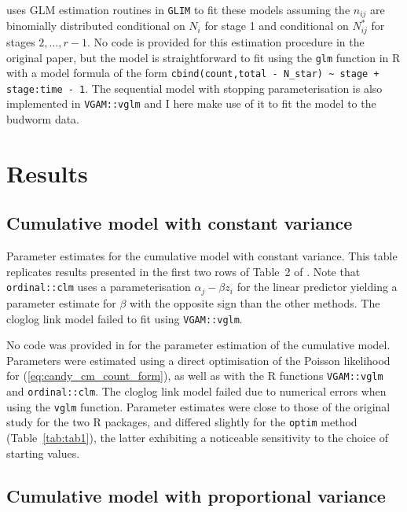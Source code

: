 \citet{candy1991modeling} uses GLM estimation routines in \verb+GLIM+ to fit these models assuming the $n_{ij}$ are binomially distributed conditional on $N_i$ for stage 1 and conditional on $N^*_{ij}$ for stages $2,\dots,r-1$. No code is provided for this estimation procedure in the original paper, but the model is straightforward to fit using the \verb+glm+ function in R with a model formula of the form \verb!cbind(count,total - N_star) ~ stage + stage:time - 1!.  The sequential model with stopping parameterisation is also implemented in \verb+VGAM::vglm+ \citep{VGAM} and I here make use of it to fit the model to the budworm data.


\section{Results}
\subsection{Cumulative model with constant variance}

\begin{table}[b]
  \small
    \centering
    \caption{Parameter estimates for the cumulative model with constant variance. This table replicates results presented in the first two rows of Table~2 of \citep{candy1991modeling}. Note that \texttt{ordinal::clm} uses a parameterisation $\alpha_j - \beta z_i$ for the linear predictor yielding a parameter estimate for $\beta$ with the opposite sign than the other methods. The cloglog link model failed to fit using \texttt{VGAM::vglm}.}
  
  \label{tab:tab1}
\end{table}

No code was provided in \citep{candy1991modeling} for the parameter estimation of the cumulative model. Parameters were estimated using a direct optimisation of the Poisson likelihood for (\ref{eq:candy_cm_count_form}), as well as with the R functions \verb+VGAM::vglm+ and \verb+ordinal::clm+. The cloglog link model failed due to numerical errors when using the \verb+vglm+ function. Parameter estimates were close to those of the original study for the two R packages, and differed slightly for the \verb+optim+ method (Table~\ref{tab:tab1}), the latter exhibiting a noticeable sensitivity to the choice of starting values.

\subsection{Cumulative model with proportional variance}

